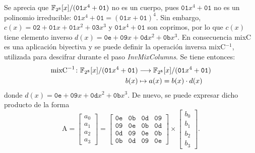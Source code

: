 Se aprecia que $\mathbb{F}_{2^8}[x]/(\texttt{01}x^4+\texttt{01})$ no es un cuerpo, pues $\texttt{01}x^4+\texttt{01}$ no es un polinomio irreducible: $\texttt{01}x^4+\texttt{01} = (\texttt{01}x + \texttt{01})^4$. Sin embargo, $c(x) = \texttt{02} + \texttt{01}x +\texttt{01}x^2 +\texttt{03}x^3$ y $\texttt{01}x^4+\texttt{01}$ son coprimos, por lo que $c(x)$ tiene elemento inverso $d(x) = \texttt{0e} + \texttt{09}x +\texttt{0d}x^2 +\texttt{0b}x^3$. En consecuencia mixC es una aplicación biyectiva y se puede definir la operación inversa mixC$^{-1}$, utilizada para descifrar durante el paso \textit{InvMixColumns}. Se tiene entonces:
\begin{align*}
     \text{mixC}^{-1}\colon \mathbb{F}_{2^8}[x]/(\texttt{01}x^4+\texttt{01}) &\longrightarrow \mathbb{F}_{2^8}[x]/(\texttt{01}x^4+\texttt{01})\\
     b(x) &\mapsto a(x) = b(x) \cdot d(x)
\end{align*}
donde $d(x) = \texttt{0e} + \texttt{09}x +\texttt{0d}x^2 +\texttt{0b}x^3$. De nuevo, se puede expresar dicho producto de la forma
\[
\text{A}  =
    \begin{bmatrix} 
    a_0 \\ a_1 \\ a_2 \\ a_3
    \end{bmatrix} 
= 
    \begin{bmatrix} 
        \texttt{0e} & \texttt{0b} & \texttt{0d} & \texttt{09}\\
        \texttt{09} & \texttt{0e} & \texttt{0b} & \texttt{0d}\\
        \texttt{0d} & \texttt{09} & \texttt{0e} & \texttt{0b}\\
        \texttt{0b} & \texttt{0d} & \texttt{09} & \texttt{0e}
    \end{bmatrix} 
\times 
    \begin{bmatrix} 
    b_0 \\ b_1 \\ b_2 \\ b_3
    \end{bmatrix}
.
\]